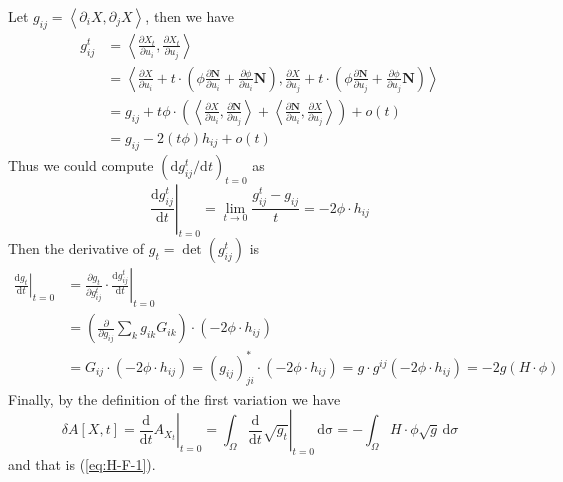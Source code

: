 Let $g_{ij}=\left<\partial_i X,\partial_j X\right>$, then we have
\begin{align*}
    g^t_{ij}&=\left<\frac{\partial X_t}{\partial u_i},\frac{\partial X_t}{\partial u_j}\right>\\
    &=\left<\frac{\partial X}{\partial u_i}+t\cdot\left(\phi\frac{\partial\mathbf{N}}{\partial u_i}+\frac{\partial\phi}{\partial u_i}\mathbf{N}\right),\frac{\partial X}{\partial u_j}+t\cdot\left(\phi\frac{\partial\mathbf{N}}{\partial u_j}+\frac{\partial\phi}{\partial u_j}\mathbf{N}\right)\right>\\
    &=g_{ij}+t\phi\cdot\left(\left<\frac{\partial X}{\partial u_i},\frac{\partial \mathbf{N}}{\partial u_j}\right>+\left<\frac{\partial\mathbf{N}}{\partial u_i},\frac{\partial X}{\partial u_j}\right>\right)+o(t)\\
    &=g_{ij}-2(t\phi)h_{ij}+o(t)
\end{align*}
Thus we could compute ${\left(\mathrm{d}g^t_{ij}/\mathrm{d}t\right)}_{t=0}$ as
\begin{equation*}
    {\left.\frac{\mathrm{d}g^t_{ij}}{\mathrm{d}t}\right|}_{t=0}=\lim_{t\to 0}\frac{g^t_{ij}-g_{ij}}{t}=-2\phi\cdot h_{ij}
\end{equation*}
Then the derivative of $g_t=\det{(g^t_{ij})}$ is
\begin{align*}
    {\left.\frac{\mathrm{d}g_t}{\mathrm{d}t}\right|}_{t=0}&={\left.\frac{\partial g_t}{\partial g^t_{ij}}\cdot\frac{\mathrm{d}g^t_{ij}}{\mathrm{d} t}\right|}_{t=0}\\
    &=\left(\frac{\partial}{\partial g_{ij}}\sum_{k}g_{ik}G_{ik}\right)\cdot\left(-2\phi\cdot h_{ij}\right)\\
    &=G_{ij}\cdot\left(-2\phi\cdot h_{ij}\right)={\left(g_{ij}\right)}^*_{ji}\cdot\left(-2\phi\cdot h_{ij}\right)=g\cdot g^{ij}\left(-2\phi\cdot h_{ij}\right)=-2g\left(H\cdot\phi\right)
\end{align*}
Finally, by the definition of the first variation we have
\begin{equation*}
    \delta A[X,t]={\left.\frac{\mathrm{d}}{\mathrm{d}t}A_{X_t}\right|}_{t=0}={\left.\int_{\Omega}\frac{\mathrm{d}}{\mathrm{d}t}\sqrt{g_t}\right|}_{t=0}\,\mathrm{d\sigma}=-\int_{\Omega}H\cdot\phi\sqrt{g}\,\mathrm{d}\sigma
\end{equation*}
and that is (\ref{eq:H-F-1}).